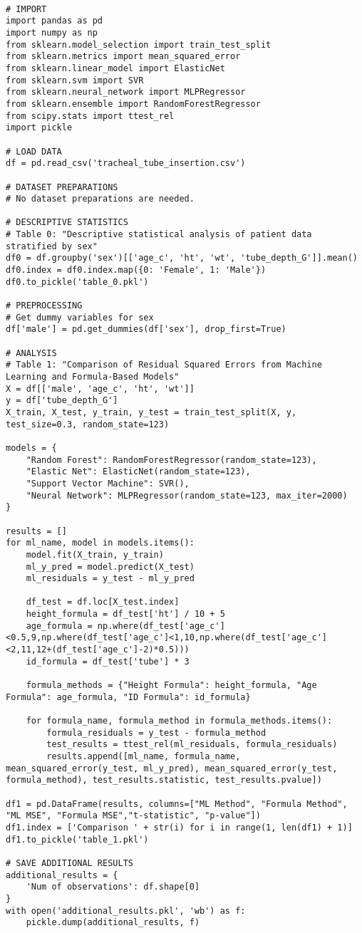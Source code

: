 \documentclass[11pt]{article}
\begin{document}
\begin{verbatim}

# IMPORT
import pandas as pd
import numpy as np
from sklearn.model_selection import train_test_split
from sklearn.metrics import mean_squared_error
from sklearn.linear_model import ElasticNet
from sklearn.svm import SVR
from sklearn.neural_network import MLPRegressor
from sklearn.ensemble import RandomForestRegressor
from scipy.stats import ttest_rel
import pickle

# LOAD DATA
df = pd.read_csv('tracheal_tube_insertion.csv')

# DATASET PREPARATIONS
# No dataset preparations are needed.

# DESCRIPTIVE STATISTICS
# Table 0: "Descriptive statistical analysis of patient data stratified by sex"
df0 = df.groupby('sex')[['age_c', 'ht', 'wt', 'tube_depth_G']].mean()
df0.index = df0.index.map({0: 'Female', 1: 'Male'})
df0.to_pickle('table_0.pkl')

# PREPROCESSING 
# Get dummy variables for sex
df['male'] = pd.get_dummies(df['sex'], drop_first=True)

# ANALYSIS
# Table 1: "Comparison of Residual Squared Errors from Machine Learning and Formula-Based Models"
X = df[['male', 'age_c', 'ht', 'wt']]
y = df['tube_depth_G']
X_train, X_test, y_train, y_test = train_test_split(X, y, test_size=0.3, random_state=123)

models = {
    "Random Forest": RandomForestRegressor(random_state=123),
    "Elastic Net": ElasticNet(random_state=123),
    "Support Vector Machine": SVR(),
    "Neural Network": MLPRegressor(random_state=123, max_iter=2000)
}

results = []
for ml_name, model in models.items():
    model.fit(X_train, y_train)
    ml_y_pred = model.predict(X_test)
    ml_residuals = y_test - ml_y_pred

    df_test = df.loc[X_test.index]
    height_formula = df_test['ht'] / 10 + 5
    age_formula = np.where(df_test['age_c']<0.5,9,np.where(df_test['age_c']<1,10,np.where(df_test['age_c']<2,11,12+(df_test['age_c']-2)*0.5)))
    id_formula = df_test['tube'] * 3

    formula_methods = {"Height Formula": height_formula, "Age Formula": age_formula, "ID Formula": id_formula}

    for formula_name, formula_method in formula_methods.items():
        formula_residuals = y_test - formula_method
        test_results = ttest_rel(ml_residuals, formula_residuals)        
        results.append([ml_name, formula_name, mean_squared_error(y_test, ml_y_pred), mean_squared_error(y_test, formula_method), test_results.statistic, test_results.pvalue])

df1 = pd.DataFrame(results, columns=["ML Method", "Formula Method", "ML MSE", "Formula MSE","t-statistic", "p-value"])
df1.index = ['Comparison ' + str(i) for i in range(1, len(df1) + 1)]
df1.to_pickle('table_1.pkl')

# SAVE ADDITIONAL RESULTS
additional_results = {
    'Num of observations': df.shape[0]
}
with open('additional_results.pkl', 'wb') as f:
    pickle.dump(additional_results, f)

\end{verbatim}
\end{document}
